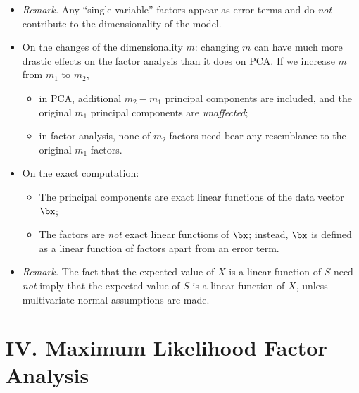 \documentclass[12pt]{article}
\begin{document}
\begin{enumerate}[label=\textbf{\arabic*.}]
\begin{enumerate}
\begin{itemize}
			\item[] \textit{Remark.} Any ``single variable'' factors appear as error terms and do \emph{not} contribute to the dimensionality of the model. 
			
			\item On the changes of the dimensionality $m$: changing $m$ can have much more drastic effects on the factor analysis than it does on PCA. If we increase $m$ from $m_1$ to $m_2$, 
			\begin{itemize}
				\item in PCA, additional $m_2 - m_1$ principal components are included, and the original $m_1$ principal components are \emph{unaffected}; 
				\item in factor analysis, none of $m_2$ factors need bear any resemblance to the original $m_1$ factors. 
			\end{itemize}
			
			\item On the exact computation: 
			\begin{itemize}
				\item The principal components are exact linear functions of the data vector $\bx$; 
				\item The factors are \emph{not} exact linear functions of $\bx$; instead, $\bx$ is defined as a linear function of factors apart from an error term. 
			\end{itemize}
			
			\item[] \textit{Remark.} The fact that the expected value of $X$ is a linear function of $S$ need \emph{not} imply that the expected value of $S$ is a linear function of $X$, unless multivariate normal assumptions are made. 
		\end{itemize}
		
	\end{enumerate}

\end{enumerate}


\section*{IV. Maximum Likelihood Factor Analysis}
\end{document}
